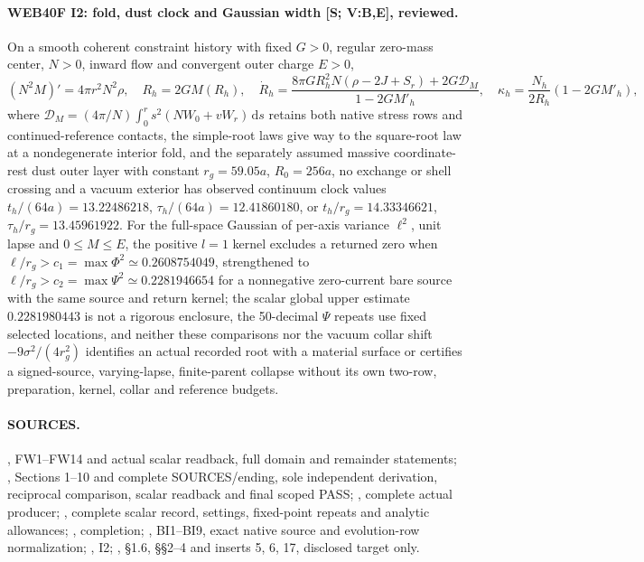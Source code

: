 \paragraph{WEB40F I2: fold, dust clock and Gaussian width [S; V:B,E], reviewed.}
On a smooth coherent constraint history with fixed \(G>0\), regular
zero-mass center, \(N>0\), inward flow and convergent outer charge \(E>0\),
\[
 (N^2M)'=4\pi r^2N^2\rho,\quad R_h=2GM(R_h),\quad
 \dot R_h=\frac{8\pi G R_h^2N(\rho-2J+S_r)+2G\mathcal D_M}
                  {1-2GM'_h},\quad
 \kappa_h=\frac{N_h}{2R_h}(1-2GM'_h),
\]
where \(\mathcal D_M=(4\pi/N)\int_0^r s^2(NW_0+vW_r)\,\mathrm ds\)
retains both native stress rows and continued-reference contacts,
the simple-root laws give way to the square-root law at a nondegenerate
interior fold, and the separately assumed massive coordinate-rest
dust outer layer with constant \(r_g=59.05a\), \(R_0=256a\), no exchange
or shell crossing and a vacuum exterior has observed continuum clock
values \(t_h/(64a)=13.22486218\), \(\tau_h/(64a)=12.41860180\), or
\(t_h/r_g=14.33346621\), \(\tau_h/r_g=13.45961922\).
For the full-space Gaussian of per-axis variance \(\ell^2\), unit lapse
and \(0\leq M\leq E\), the positive \(l=1\) kernel excludes a returned
zero when \(\ell/r_g>c_1=\max\Phi^2\simeq0.2608754049\), strengthened
to \(\ell/r_g>c_2=\max\Psi^2\simeq0.2281946654\) for a nonnegative
zero-current bare source with the same source and return kernel;
the scalar global upper estimate \(0.2281980443\) is not a rigorous
enclosure, the 50-decimal \(\Psi\) repeats use fixed selected locations,
and neither these comparisons nor the vacuum collar shift
\(-9\sigma^2/(4r_g^2)\) identifies an actual recorded root with a
material surface or certifies a signed-source, varying-lapse,
finite-parent collapse without its own two-row, preparation, kernel,
collar and reference budgets.

\paragraph{SOURCES.}
, FW1--FW14 and actual scalar
readback, full domain and remainder statements;
, Sections 1--10 and complete
SOURCES/ending, sole independent derivation, reciprocal comparison,
scalar readback and final scoped PASS;
, complete actual producer;
, complete
scalar record, settings, fixed-point repeats and analytic allowances;
, completion;
, BI1--BI9, exact native
source and evolution-row normalization;
, I2;
,
\S1.6, \S\S2--4 and inserts 5, 6, 17, disclosed target only.
